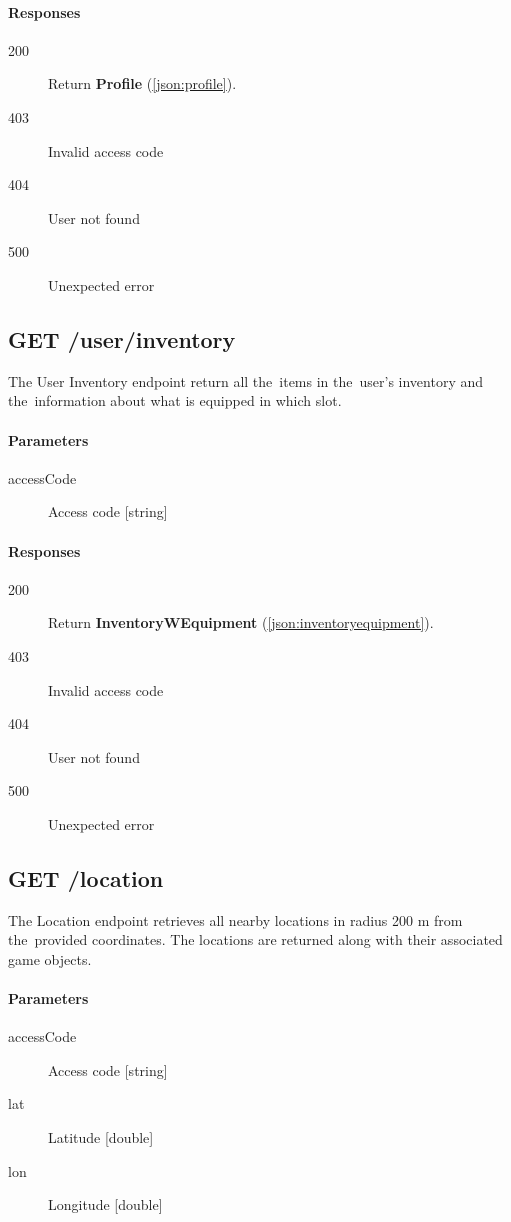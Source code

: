 		\paragraph*{Responses}
			\begin{description}
				\item[200] Return \textbf{Profile} (\ref{json:profile}).
				\item[403] Invalid access code
				\item[404] User not found
				\item[500] Unexpected error
			\end{description}
	
	\subsection{GET /user/inventory}
	The User Inventory endpoint return all the~items in the~user's inventory and the~information about what is equipped in which slot.
		\paragraph*{Parameters}
			\begin{description}
				\item[accessCode] Access code [string]
			\end{description}
		\paragraph*{Responses}
			\begin{description}
				\item[200] Return \textbf{InventoryWEquipment} (\ref{json:inventoryequipment}).
				\item[403] Invalid access code
				\item[404] User not found
				\item[500] Unexpected error
			\end{description}
		
	\subsection{GET /location}
	The Location endpoint retrieves all nearby locations in radius 200 m from the~provided coordinates. The locations are returned along with their associated game objects.
		\paragraph*{Parameters}
			\begin{description}
				\item[accessCode] Access code [string]
				\item[lat] Latitude [double]
				\item[lon] Longitude [double]
			\end{description}

